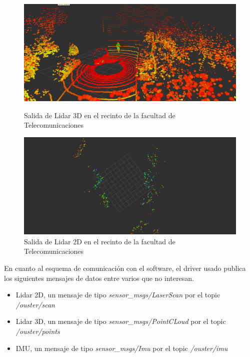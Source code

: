 \begin{figure}[htbp]
  \centering
  \begin{minipage}[b]{0.45\textwidth}
    \centering
    \includegraphics[width=\textwidth]{images/lidar3d_2.png}
    \caption{Salida de Lidar 3D en el recinto de la facultad de Telecomunicaciones}
    \label{fig:lidar_2d_pruebas}
  \end{minipage}
  \hfill
  \begin{minipage}[b]{0.45\textwidth}
    \centering
    \includegraphics[width=\textwidth]{images/lidar2d.png}
    \caption{Salida de Lidar 2D en el recinto de la facultad de Telecomunicaciones}
    \label{fig:lidar_3d_pruebas}
  \end{minipage}
\end{figure}
En cuanto al esquema de comunicación con el software, el driver usado publica los siguientes mensajes de datos entre varios que no interesan.
\begin{itemize}
    \item Lidar 2D, un mensaje de tipo \textit{sensor\_msgs/LaserScan} por el topic \textit{/ouster/scan}
    \item Lidar 3D, un mensaje de tipo \textit{sensor\_msgs/PointCLoud} por el topic \textit{/ouster/points}
    \item IMU, un mensaje de tipo \textit{sensor\_msgs/Imu} por el topic \textit{/ouster/imu}
\end{itemize}

